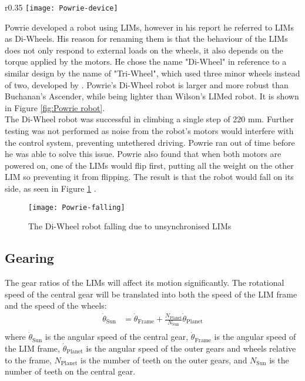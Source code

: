 \begin{wrapfigure}{r}{0.35\textwidth}
	\centering
	\texttt{[image: Powrie-device]}
	\caption{Powrie's Di-Wheel Robot \citep{Powrie-2019}}
	\label{fig:Powrie robot}
\end{wrapfigure}Powrie developed a robot using LIMs, however in his report he referred to LIMs as Di-Wheels. His reason for renaming them is that the behaviour of the LIMs does not only respond to external loads on the wheels, it also depends on the torque applied by the motors. He chose the name "Di-Wheel" in reference to a similar design by the name of "Tri-Wheel", which used three minor wheels instead of two, developed by \cite{Smith-2015}. Powrie's Di-Wheel robot is larger and more robust than Buchanan's Ascender, while being lighter than Wilson's LIMed robot. It is shown in Figure \ref{fig:Powrie robot}.\\


The Di-Wheel robot was successful in climbing a single step of 220 mm. Further testing was not performed as noise from the robot's motors would interfere with the control system, preventing untethered driving. Powrie ran out of time before he was able to solve this issue. Powrie also found that when both motors are powered on, one of the LIMs would flip first, putting all the weight on the other LIM so preventing it from flipping. The result is that the robot would fall on its side, as seen in Figure \ref{Powrie falling} \citep{Powrie-2019}.\\
\begin{figure}[ht]
	\centering
	\texttt{[image: Powrie-falling]}
	\caption{The Di-Wheel robot falling due to unsynchronised LIMs \citep{Powrie-2019}}
	\label{Powrie falling}
\end{figure}


\subsection{Gearing} %
The gear ratios of the LIMs will affect its motion significantly. The rotational speed of the central gear will be translated into both the speed of the LIM frame and the speed of the wheels:
\begin{align*}
	\dot{\theta}_{\mathrm{Sun}} &= \dot{\theta}_{\mathrm{Frame}} + \frac{N_\mathrm{Planet}}{N_\mathrm{Sun}}\dot{\theta}_{\mathrm{Planet}} \tag{1}\\
\end{align*}
where $\dot{\theta}_{\mathrm{Sun}}$ is the angular speed of the central gear, $\dot{\theta}_{\mathrm{Frame}}$ is the angular speed of the LIM frame, $\dot{\theta}_{\mathrm{Planet}}$ is the angular speed of the outer gears and wheels relative to the frame, $N_{\mathrm{Planet}}$ is the number of teeth on the outer gears, and $N_\mathrm{Sun}$ is the number of teeth on the central gear.\\

